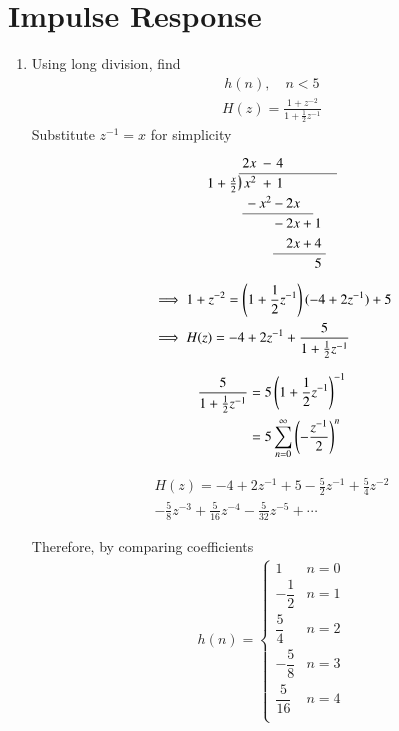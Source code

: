 \documentclass[journal,12pt,twocolumn]{IEEEtran}
\newcommand{\longdiv}{\smash{\mkern-0.43mu\vstretch{1.31}{\hstretch{.7}{)}}\mkern-5.2mu\vstretch{1.31}{\hstretch{.7}{)}}}}
\renewcommand\thesection{\arabic{section}}
\begin{document}
\section{Impulse Response}
\begin{enumerate}[label=\thesection.\arabic*]
\item Using long division, find
\begin{align}
	h(n), \quad n < 5
\end{align}
\solution \begin{align}
	H(z) = \frac{1+z^{-2}}{1+\frac{1}{2}z^{-1}}
\end{align}
Substitute $z^{-1} = x$ for simplicity
\[
\arraycolsep=1pt
\renewcommand\arraystretch{1.2}
\begin{array}{*1r @{\hskip\arraycolsep}c@{\hskip\arraycolsep} *{11}r}
        &          & 2x & - & 4  \\
\cline{2-13}
1+\frac{x}{2} & \longdiv & x^2 & +  & 1  &   &      &   &      &   &      &   &        \\
        &          & - & x^2 & - & 2x &   &   &      &   &      &   &        \\
\cline{3-7}
        &          &   &   & - & 2x & + &  1 &      &   &      &   &        \\
        &          &   &   &  & 2x &  + & 4 &   &   &      &   &        \\
\cline{5-9}
        &          &   &   &   &   &  & 5 &   &   &      &   &        \\
\end{array}
\]
\begin{align}
	&\implies 1 + z^{-2} = \left(1+\frac{1}{2}z^{-1}\right)(-4+2z^{-1}) + 5\\
	&\implies H(z) = -4+2z^{-1} + \frac{5}{1+\frac{1}{2}z^{-1}}
\end{align}


\begin{align}
	\frac{5}{1 + \frac12 z^{-1}} &= 5 \left(1 + \frac12 z^{-1}\right)^{-1} \\
	&= 5 \sum_{n=0}^\infty \left(-\frac{z^{-1}}{2}\right)^n
\end{align}

\begin{multline}
	H(z) = -4 + 2z^{-1} + 5 - \frac{5}{2}z^{-1} + \frac{5}{4}z^{-2}\\ - \frac{5}{8}z^{-3}  + \frac{5}{16}z^{-4} - \frac{5}{32}z^{-5} + \cdots
\end{multline}

Therefore, by comparing coefficients
\begin{align}
	h(n) = 
	\begin{cases}
		1 & n = 0 \\
		-\dfrac12 & n = 1 \\
		\dfrac{5}{4} & n = 2 \\
		-\dfrac{5}{8} & n = 3 \\
		\dfrac{5}{16} & n = 4 \\
	\end{cases}
\end{align}


\end{enumerate}
\end{document}
